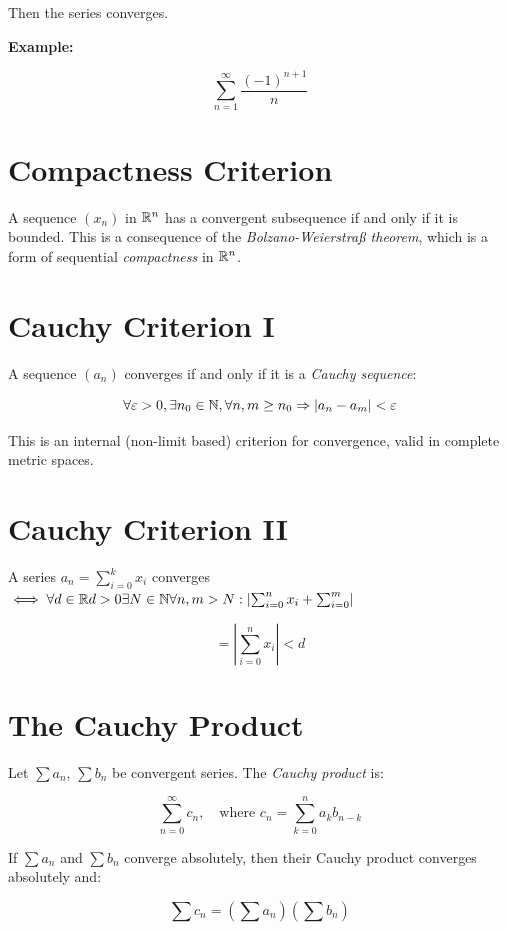 Then the series converges.

\textbf{Example:}

\[
    \sum_{n=1}^\infty \frac{{(-1)}^{n+1}}{n}
\]

\section{Compactness Criterion}

A sequence \((x_n)\) in \(\mathbb{R}^n\) has a convergent subsequence if and only if it is bounded. 
This is a consequence of the \emph{Bolzano-Weierstraß theorem}, which is a form of sequential 
\emph{compactness} in \(\mathbb{R}^n\).

\section{Cauchy Criterion I}

A sequence \((a_n)\) converges if and only if it is a \emph{Cauchy sequence}:

\[
    \forall \varepsilon > 0, \exists n_0 \in \mathbb{N}, \forall n, m \ge n_0 \Rightarrow |a_n - a_m| < \varepsilon
\]

This is an internal (non-limit based) criterion for convergence, valid in complete metric spaces.

\section{Cauchy Criterion II}

A series \(a_n = \sum_{i = 0}^{k}x_i\) converges \(\iff \forall d \in \mathbb{R} d > 0 
\exists N \in \mathbb{N} \forall n,m > N: \left| \sum_{i = 0}^{n}x_i + \sum_{i=0}^{m}\right|\)

\[
    = \left|\sum_{i = 0}^{n}x_i\right| < d
\]

\section{The Cauchy Product}

Let \(\sum a_n\), \(\sum b_n\) be convergent series. The \emph{Cauchy product} is:

\[
    \sum_{n=0}^\infty c_n, \quad \text{where } c_n = \sum_{k=0}^n a_k b_{n-k}
\]

If \(\sum a_n\) and \(\sum b_n\) converge absolutely, then their Cauchy product converges absolutely and:

\[
    \sum c_n = \left( \sum a_n \right) \left( \sum b_n \right)
\]


